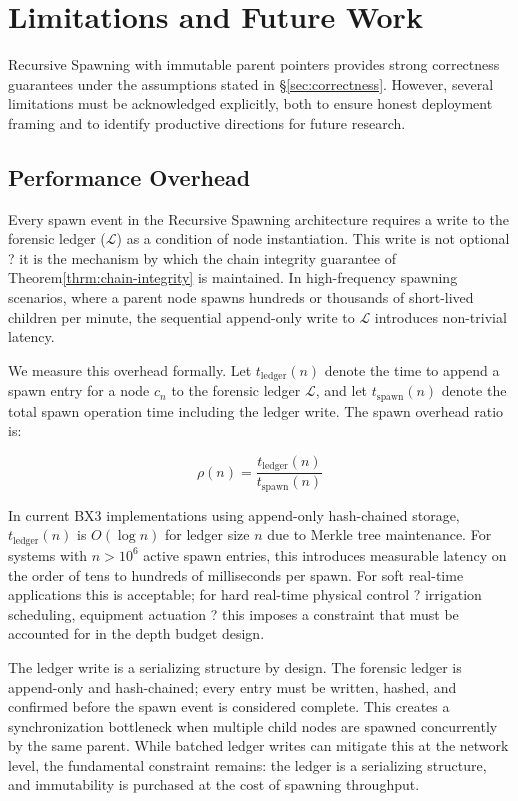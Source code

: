\section{Limitations and Future Work}
\label{sec:limitations}

Recursive Spawning with immutable parent pointers provides strong correctness guarantees under the assumptions stated in \S\ref{sec:correctness}. However, several limitations must be acknowledged explicitly, both to ensure honest deployment framing and to identify productive directions for future research.

\subsection{Performance Overhead}
\label{sec:lim-perf}

Every spawn event in the Recursive Spawning architecture requires a write to the forensic ledger ($\mathcal{L}$) as a condition of node instantiation. This write is not optional ? it is the mechanism by which the chain integrity guarantee of Theorem\;\ref{thrm:chain-integrity} is maintained. In high-frequency spawning scenarios, where a parent node spawns hundreds or thousands of short-lived children per minute, the sequential append-only write to $\mathcal{L}$ introduces non-trivial latency.

We measure this overhead formally. Let $t_{\text{ledger}}(n)$ denote the time to append a spawn entry for a node $c_n$ to the forensic ledger $\mathcal{L}$, and let $t_{\text{spawn}}(n)$ denote the total spawn operation time including the ledger write. The spawn overhead ratio is:

\[
\rho(n) = \frac{t_{\text{ledger}}(n)}{t_{\text{spawn}}(n)}
\tag{2}
\]

In current BX3 implementations using append-only hash-chained storage, $t_{\text{ledger}}(n)$ is $O(\log n)$ for ledger size $n$ due to Merkle tree maintenance. For systems with $n > 10^6$ active spawn entries, this introduces measurable latency on the order of tens to hundreds of milliseconds per spawn. For soft real-time applications this is acceptable; for hard real-time physical control ? irrigation scheduling, equipment actuation ? this imposes a constraint that must be accounted for in the depth budget design.

The ledger write is a serializing structure by design. The forensic ledger is append-only and hash-chained; every entry must be written, hashed, and confirmed before the spawn event is considered complete. This creates a synchronization bottleneck when multiple child nodes are spawned concurrently by the same parent. While batched ledger writes can mitigate this at the network level, the fundamental constraint remains: the ledger is a serializing structure, and immutability is purchased at the cost of spawning throughput.

